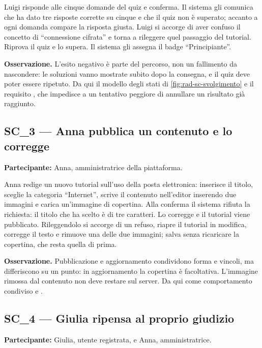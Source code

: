 Luigi risponde alle cinque domande del quiz e conferma. Il sistema gli
comunica che ha dato tre risposte corrette su cinque e che il quiz non è
superato; accanto a ogni domanda compare la risposta giusta. Luigi si accorge
di aver confuso il concetto di \enquote{connessione cifrata} e torna a
rileggere quel passaggio del tutorial. Riprova il quiz e lo supera. Il
sistema gli assegna il badge \enquote{Principiante}.

\textbf{Osservazione.} L'esito negativo è parte del percorso, non un
fallimento da nascondere: le soluzioni vanno mostrate subito dopo la
consegna, e il quiz deve poter essere ripetuto. Da qui il modello degli stati
di \cref{fig:rad-sc-svolgimento} e il requisito , che impedisce
a un tentativo peggiore di annullare un risultato già raggiunto.

\subsection{SC\_3 — Anna pubblica un contenuto e lo corregge}

\begin{nota}
\textbf{Partecipante:} Anna, amministratrice della piattaforma.
\end{nota}

Anna redige un nuovo tutorial sull'uso della posta elettronica: inserisce il
titolo, sceglie la categoria \enquote{Internet}, scrive il contenuto
nell'editor inserendo due immagini e carica un'immagine di copertina. Alla
conferma il sistema rifiuta la richiesta: il titolo che ha scelto è di tre
caratteri. Lo corregge e il tutorial viene pubblicato. Rileggendolo si accorge
di un refuso, riapre il tutorial in modifica, corregge il testo e rimuove una
delle due immagini; salva senza ricaricare la copertina, che resta quella di
prima.

\textbf{Osservazione.} Pubblicazione e aggiornamento condividono forma e
vincoli, ma differiscono su un punto: in aggiornamento la copertina è
facoltativa. L'immagine rimossa dal contenuto non deve restare sul server.
Da qui  come comportamento condiviso e .

\subsection{SC\_4 — Giulia ripensa al proprio giudizio}

\begin{nota}
\textbf{Partecipante:} Giulia, utente registrata, e Anna, amministratrice.
\end{nota}

